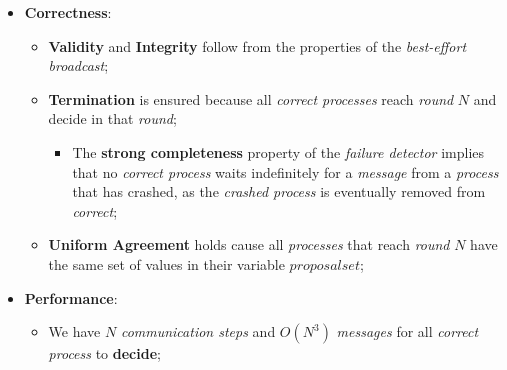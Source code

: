 \documentclass{article}
\begin{document}
\begin{itemize}
\item \textbf{Correctness}:
\begin{itemize}
\item \textbf{Validity} and \textbf{Integrity} follow from the properties of the \emph{best-effort broadcast};
\item \textbf{Termination} is ensured because all \emph{correct processes} reach \emph{round} $N$ and decide in that \emph{round};
\begin{itemize}
\item The \textbf{strong completeness} property of the \emph{failure detector} implies that no \emph{correct process} waits indefinitely for a \emph{message} from a \emph{process} that has crashed, as the \emph{crashed process} is eventually removed from \emph{correct}; 
\end{itemize}
\item \textbf{Uniform Agreement} holds cause all \emph{processes} that reach \emph{round} $N$ have the same set of values in their variable $proposalset$;
\end{itemize}
\item \textbf{Performance}:
\begin{itemize}
\item We have $N$ \emph{communication steps} and $O(N^3)$ \emph{messages} for all \emph{correct process} to \textbf{decide};
\end{itemize}
\end{itemize}
\end{document}
